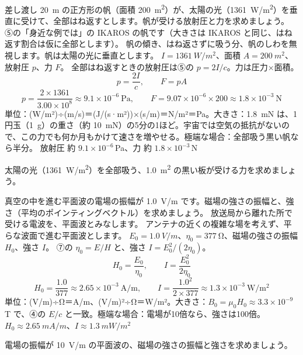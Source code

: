 \begin{phreidai}[宇宙ヨットの帆を押す力]
\label{ph:電-15:ex4}差し渡し \qty{20}{m} の正方形の帆（面積 \qty{200}{m^2}）が、太陽の光（\qty{1361}{W/m^2}）を垂直に受けて、全部はね返すとします。帆が受ける放射圧と力を求めましょう。
\phbamen
⑤の「身近な例では」の IKAROS の帆です（大きさは IKAROS と同じ、はね返す割合は仮に全部とします）。
\phmushi
帆の傾き、はね返さずに吸う分、帆のしわを無視します。帆は太陽の光に垂直とします。
\phzu
$I=\qty{1361}{W/m^2}$、面積 $A=\qty{200}{m^2}$、放射圧 $p$、力 $F$。
\phriyu
全部はね返すときの放射圧は⑤の $p=2I/c$。力は圧力×面積。
\phtateru
\[ p=\frac{2I}{c},\qquad F=pA \]
\phtoku
\[ p=\frac{2\times1361}{3.00\times10^8}\approx9.1\times10^{-6}\ \mathrm{Pa},\qquad F=9.07\times10^{-6}\times200\approx1.8\times10^{-3}\ \mathrm{N} \]
\phtashikame
単位：(W/m²)÷(m/s)＝(J/(s·m²))×(s/m)＝N/m²＝Pa。大きさ：\qty{1.8}{mN} は、1円玉（\qty{1}{g}）の重さ（約 \qty{10}{mN}）の5分の1ほど。宇宙では空気の抵抗がないので、この力でも何か月もかけて速さを増やせる。極端な場合：全部吸う黒い帆なら半分。
\kotae 放射圧 約 $9.1\times10^{-6}$\,Pa、力 約 $1.8\times10^{-3}$\,N
\end{phreidai}
\begin{jibun}
太陽の光（\qty{1361}{W/m^2}）を全部吸う、\qty{1.0}{m^2} の黒い板が受ける力を求めましょう。
\end{jibun}

\begin{phreidai}[平面波の磁場の強さ]
\label{ph:電-15:ex5}真空の中を進む平面波の電場の振幅が \qty{1.0}{V/m} です。磁場の強さの振幅と、強さ（平均のポインティングベクトル）を求めましょう。
\phbamen
放送局から離れた所で受ける電波を、平面波とみなします。
\phmushi
アンテナの近くの複雑な場を考えず、平らな波面で進む平面波とします。
\phzu
$E_0=\qty{1.0}{V/m}$、$\eta_0=\qty{377}{\ohm}$、磁場の強さの振幅 $H_0$、強さ $I$。
\phriyu
⑦の $\eta_0=E/H$ と、強さ $I=E_0^2/(2\eta_0)$。
\phtateru
\[ H_0=\frac{E_0}{\eta_0},\qquad I=\frac{E_0^2}{2\eta_0} \]
\phtoku
\[ H_0=\frac{1.0}{377}\approx2.65\times10^{-3}\ \mathrm{A/m},\qquad I=\frac{1.0^2}{2\times377}\approx1.3\times10^{-3}\ \mathrm{W/m^2} \]
\phtashikame
単位：(V/m)÷Ω＝A/m、(V/m)²÷Ω＝W/m²。大きさ：$B_0=\mu_0H_0\approx3.3\times10^{-9}$\,T で、④の $E/c$ と一致。極端な場合：電場が10倍なら、強さは100倍。
\kotae $H_0\approx\qty{2.65}{mA/m}$、$I\approx\qty{1.3}{mW/m^2}$
\end{phreidai}
\begin{jibun}
電場の振幅が \qty{10}{V/m} の平面波の、磁場の強さの振幅と強さを求めましょう。
\end{jibun}

